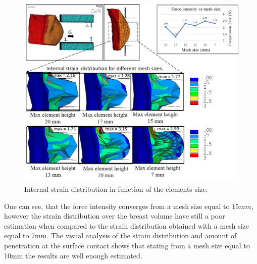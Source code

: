 \begin{figure}[!h]
\centering
\includegraphics[width=\textwidth,keepaspectratio]{figures/meshConvergence.jpg} 
\caption{Internal strain distribution in function of the elements size. }\label{fig:meshconvergence}
\end{figure}

One can see, that the force intensity converges from a mesh size equal to $15mm$, however the strain distribution over the breast volume have still a poor estimation when compared to the strain distribution obtained with a mesh size equal to 7mm. The visual analysis of the strain distribution and amount of penetration at the surface contact  shows that stating from a mesh size equal to 10mm the results are well enough estimated. 